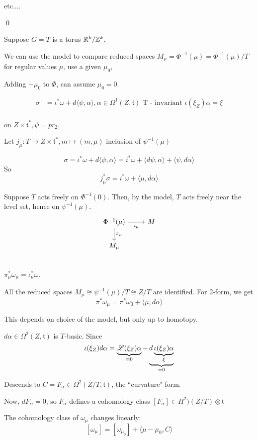 \documentclass[x11names,reqno,14pt]{extarticle}
\newcommand{\mk}[1]{\mathfrak{#1}}
\renewcommand{\t}{\mk{t}}
\begin{document}
etc....

\qed

Suppose $G = T$ is a torus $\mathbb{R}^k/\mathbb{Z}^k$. 

We can use the model to compare reduced spaces $M_\mu = \Phi^{-1}(\mu) = \Phi^{-1}(\mu)/T$ for regular values $\mu$, use a given $\mu_0$,

Adding $-\mu_0$ to $\Phi$, can assume $\mu_0 = 0$. 

\begin{align*}
\sigma & = \iota^*\omega + d\langle\psi,\alpha\rangle, \alpha \in\Omega^1(Z,\t)\text{ T - invariant } \iota(\xi_Z)\alpha=\xi \\
\end{align*}

on $Z\times\t^*, \psi = pr_2$. 

Let $j_\mu:T\to Z\times\t^*, m \mapsto(m,\mu)$ inclusion of $\psi^{-1}(\mu)$

\[
\sigma = \iota^*\omega + d\langle\psi,\alpha\rangle = i^*\omega + \langle d\psi,\alpha\rangle + \langle\psi,d\alpha\rangle
\]
So 
\[
j_\mu^*\sigma = i^*\omega + \langle\mu,d\alpha\rangle
\]

Suppose $T$ acts freely on $\Phi^{-1}(0)$. Then, by the model, $T$ acts freely near the level set, hence on $\psi^{-1}(\mu)$. 
\[
\begin{tikzcd}
\Phi^{-1}(\mu) \ar[r, "i_\mu"'] \ar[d, "\pi_\mu"] & M \\
M_\mu & \\
\end{tikzcd}
\]
$\pi^*_\mu\omega_\mu = \iota^*_\mu\omega$. 

All the reduced spaces $M_\mu \cong \psi^{-1}(\mu)/T \cong Z/T$ are identified. For 2-form, we get 
\[
\pi^*\omega_\mu = \pi^*\omega_0 + \langle\mu, d\alpha\rangle
\]

This depends on choice of the model, but only up to homotopy. 

$d\alpha \in \Omega^2(Z,\t)$ is $T$-basic. Since 
\[
\iota(\xi_Z)d\alpha = \underbrace{\mathscr{L}(\xi_Z)\alpha}_{=0} - \underbrace{d\underbrace{\iota(\xi_Z)\alpha}_{\xi}}_{=0}
\]

Descends to $C = F_\alpha\in\Omega^2(Z/T,\t)$, the ``curvature" form. 

Now, $dF_\alpha = 0$, so $F_\alpha$ defines a cohomology class $[F_\alpha] \in H^2)(Z/T)\otimes\t$


The cohomology class of $\omega_\mu$ changes linearly:
\[
[\omega_\mu] = [\omega_{\mu_0}] + \langle \mu - \mu_0, C \rangle
\]
\end{document}

